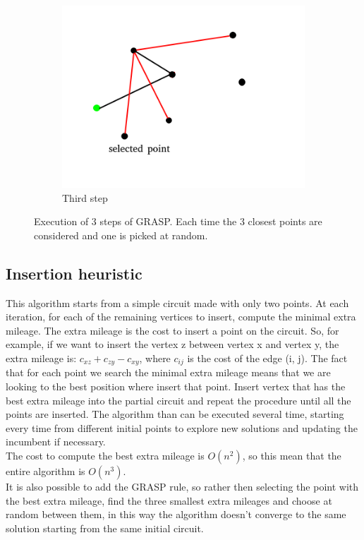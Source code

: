 \begin{figure}[h!]
\begin{subfigure}[b]{0.4\linewidth}
    \includegraphics[width=\linewidth]{media/GRASP3.png}
    \caption{Third step}
  \end{subfigure}
  \caption{Execution of 3 steps of GRASP. Each time the 3 closest points are considered and one is picked at random.}
\end{figure}

\subsection{Insertion heuristic}
This algorithm starts from a simple circuit made with only two points. At each iteration, for each of the remaining vertices to insert, compute the minimal extra mileage. The extra mileage is the cost to insert a point on the circuit. So, for example, if we want to insert the vertex z between vertex x and vertex y, the extra mileage is: $c_{xz} + c_{zy} - c_{xy}$, where $c_{ij}$ is the cost of the edge (i, j). The fact that for each point we search the minimal extra mileage means that we are looking to the best position where insert that point. Insert vertex that has the best extra mileage into the partial circuit and repeat the procedure until all the points are inserted. The algorithm than can be executed several time, starting every time from different initial points to explore new solutions and updating the incumbent if necessary. \\
The cost to compute the best extra mileage is $O(n^2)$, so this mean that the entire algorithm is $O(n^3)$.\\
It is also possible to add the GRASP rule, so rather then selecting the point with the best extra mileage, find the three smallest extra mileages and choose at random between them, in this way the algorithm doesn't converge to the same solution starting from the same initial circuit. \\

